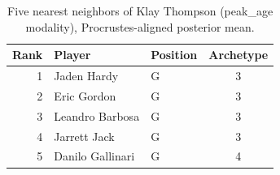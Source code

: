 \begin{table}[htbp]
  \centering\small
  \begin{tabular}{rllc}
    \toprule
    Rank & Player & Position & Archetype \\
    \midrule
    1 & Jaden Hardy & G & 3 \\
    2 & Eric Gordon & G & 3 \\
    3 & Leandro Barbosa & G & 3 \\
    4 & Jarrett Jack & G & 3 \\
    5 & Danilo Gallinari & G & 4 \\
    \bottomrule
  \end{tabular}
  \caption{Five nearest neighbors of Klay Thompson (peak_age modality), Procrustes-aligned posterior mean.}
  \label{tab:Klay_Thompson_neighbors_peak_age}
\end{table}

